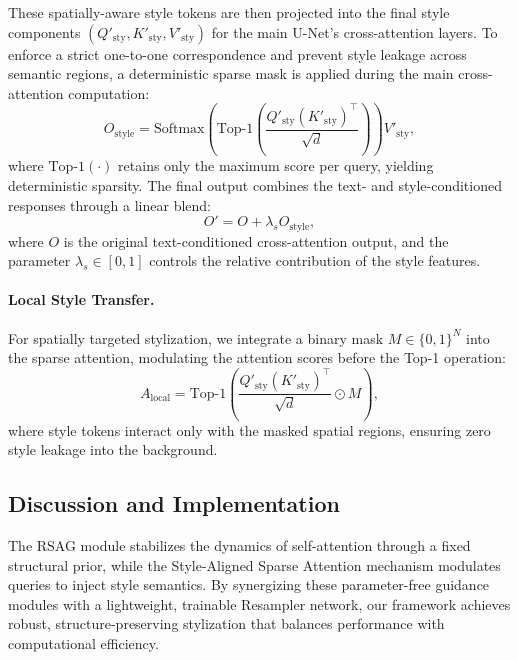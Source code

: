 These spatially-aware style tokens are then projected into the final style components $(Q'_{\text{sty}}, K'_{\text{sty}}, V'_{\text{sty}})$ for the main U-Net's cross-attention layers. To enforce a strict one-to-one correspondence and prevent style leakage across semantic regions, a deterministic sparse mask is applied during the main cross-attention computation:
\begin{equation}
    O_{\text{style}} = \text{Softmax}\!\left( \text{Top-1}\!\left(\frac{Q'_{\text{sty}}(K'_{\text{sty}})^{\!\top}}{\sqrt{d}}\right) \right)V'_{\text{sty}},
\end{equation}
where $\text{Top-1}(\cdot)$ retains only the maximum score per query, yielding deterministic sparsity. The final output combines the text- and style-conditioned responses through a linear blend:
\begin{equation}
    O' = O + \lambda_{s}O_{\text{style}},
\end{equation}
where $O$ is the original text-conditioned cross-attention output, and the parameter $\lambda_s \in [0, 1]$ controls the relative contribution of the style features.

\paragraph{Local Style Transfer.}
For spatially targeted stylization, we integrate a binary mask $M \in \{0,1\}^N$ into the sparse attention, modulating the attention scores before the Top-1 operation:
\begin{equation}
    A_\text{local} = \text{Top-1}\!\left(\frac{Q'_{\text{sty}}(K'_{\text{sty}})^{\!\top}}{\sqrt{d}} \odot M \right),
\end{equation}
where style tokens interact only with the masked spatial regions, ensuring zero style leakage into the background.

\subsection{Discussion and Implementation}

The RSAG module stabilizes the dynamics of self-attention through a fixed structural prior, while the Style-Aligned Sparse Attention mechanism modulates queries to inject style semantics. By synergizing these parameter-free guidance modules with a lightweight, trainable Resampler network, our framework achieves robust, structure-preserving stylization that balances performance with computational efficiency.

